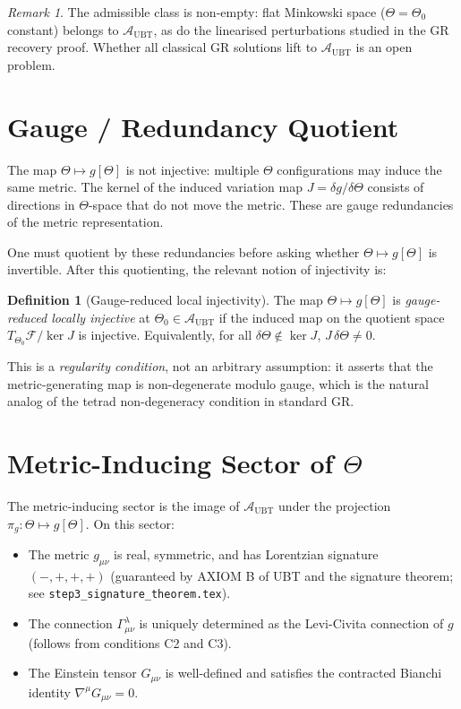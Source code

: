 \documentclass[12pt]{article}
\theoremstyle{definition}
\newtheorem{definition}[theorem]{Definition}
\theoremstyle{remark}
\newtheorem{remark}[theorem]{Remark}
\begin{document}
\begin{remark}
The admissible class is non-empty: flat Minkowski space ($\Theta = \Theta_0$
constant) belongs to $\mathcal{A}_{\mathrm{UBT}}$, as do the linearised
perturbations studied in the GR recovery proof.  Whether all classical GR
solutions lift to $\mathcal{A}_{\mathrm{UBT}}$ is an open problem.
\end{remark}

\section{Gauge / Redundancy Quotient}
\label{sec:gauge}

The map $\Theta \mapsto g[\Theta]$ is not injective: multiple $\Theta$
configurations may induce the same metric.  The kernel of the induced
variation map $J = \delta g / \delta\Theta$ consists of directions in
$\Theta$-space that do not move the metric.  These are gauge redundancies
of the metric representation.

One must quotient by these redundancies before asking whether
$\Theta \mapsto g[\Theta]$ is invertible.  After this quotienting, the
relevant notion of injectivity is:

\begin{definition}[Gauge-reduced local injectivity]
\label{def:gr_injectivity}
The map $\Theta \mapsto g[\Theta]$ is \emph{gauge-reduced locally injective}
at $\Theta_0 \in \mathcal{A}_{\mathrm{UBT}}$ if the induced map on the
quotient space $T_{\Theta_0}\mathcal{F}/\ker J$ is injective.
Equivalently, for all $\delta\Theta \notin \ker J$, $J\,\delta\Theta \neq 0$.
\end{definition}

This is a \emph{regularity condition}, not an arbitrary assumption: it asserts
that the metric-generating map is non-degenerate modulo gauge, which is the
natural analog of the tetrad non-degeneracy condition in standard GR.

\section{Metric-Inducing Sector of $\Theta$}
\label{sec:metric_sector}

The metric-inducing sector is the image of $\mathcal{A}_{\mathrm{UBT}}$
under the projection $\pi_g: \Theta \mapsto g[\Theta]$.  On this sector:
\begin{itemize}
  \item The metric $g_{\mu\nu}$ is real, symmetric, and has Lorentzian
    signature $(-,+,+,+)$ (guaranteed by AXIOM B of UBT and the signature
    theorem; see \texttt{step3\_signature\_theorem.tex}).
  \item The connection $\Gamma^\lambda_{\mu\nu}$ is uniquely determined as
    the Levi-Civita connection of $g$ (follows from conditions C2 and C3).
  \item The Einstein tensor $G_{\mu\nu}$ is well-defined and satisfies the
    contracted Bianchi identity $\nabla^\mu G_{\mu\nu} = 0$.
\end{itemize}
\end{document}
